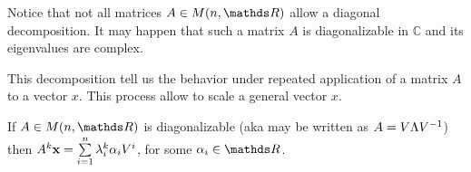 \documentclass[computationalMathematics.tex]{subfiles}
\begin{document}
Notice that not all matrices $A \in M(n, \R)$ allow a diagonal decomposition.
It may happen that such a matrix $A$ is diagonalizable in $\mathds{C}$ and its eigenvalues are complex.

\noindent This decomposition tell us the behavior under repeated application of a matrix $A$ to a vector $x$. This process allow to scale a general vector $x$.\\


\begin{proposition}
  If $A \in M(n, \R)$ is diagonalizable (aka may be written as $A = V \Lambda {V}^{-1}$) then $A^k {\bf x } = \sum\limits_{i=1}^{n} \lambda_i^k \alpha_i V^i$, for some $\alpha_i \in \R$.
\end{proposition}
\end{document}
